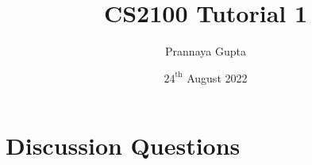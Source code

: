\documentclass[a4paper, 12pt, addpoints]{exam}
\title{CS2100 \textbf{Tutorial 1}}
\author{Prannaya Gupta}
\date{$24^{\text{th}}$ August 2022}
\begin{document}
\maketitle


\section{Discussion Questions}
\begin{questions}
\question  






\end{questions}
\newpage
\end{document}
